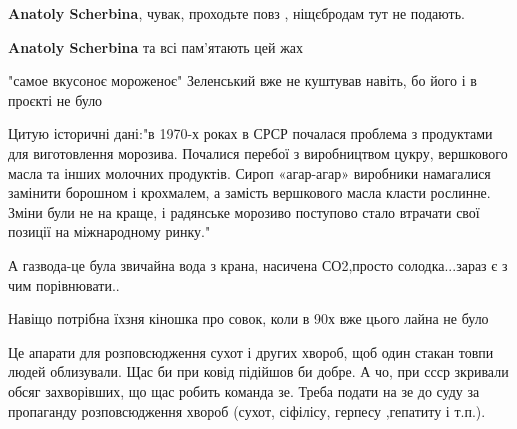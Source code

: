 \begin{itemize}
\begin{itemize}
\textbf{Anatoly Scherbina}, чувак, проходьте повз , ніщєбродам тут не подають.

 
\textbf{Anatoly Scherbina} та всі пам'ятають цей жах

\end{itemize}

 

"самое вкусоноє мороженоє" Зеленський вже не куштував навіть, бо його і в
проєкті не було

Цитую історичні дані:"в 1970-х роках в СРСР почалася проблема з продуктами для
виготовлення морозива. Почалися перебої з виробництвом цукру, вершкового масла
та інших молочних продуктів. Сироп «агар-агар» виробники намагалися замінити
борошном і крохмалем, а замість вершкового масла класти рослинне. Зміни були не
на краще, і радянське морозиво поступово стало втрачати свої позиції на
міжнародному ринку."

А газвода-це була звичайна вода з крана, насичена СО2,просто солодка...зараз є
з чим порівнювати..

Навіщо потрібна їхзня кіношка про совок, коли в 90х вже цього лайна не було


 

Це апарати для розповсюдження сухот і других хвороб, щоб один стакан товпи
людей облизували. Щас би при ковід підійшов би добре. А чо, при ссср зкривали
обсяг захворівших, що щас робить команда зе. Треба подати на зе до суду за
пропаганду розповсюдження хвороб (сухот, сіфілісу, герпесу ,гепатиту і т.п.).

 

\end{itemize}

